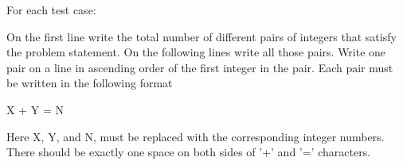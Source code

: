 For each test case: 



 On the first line write the total number of different pairs of integers that satisfy the problem statement. On the following lines write all those pairs. Write one pair on a line in ascending order of the first integer in the pair. Each pair must be written in the following format



X + Y = N



 

 Here X, Y, and N, must be replaced with the corresponding integer numbers. There should be exactly one space on both sides of '+' and '=' characters.